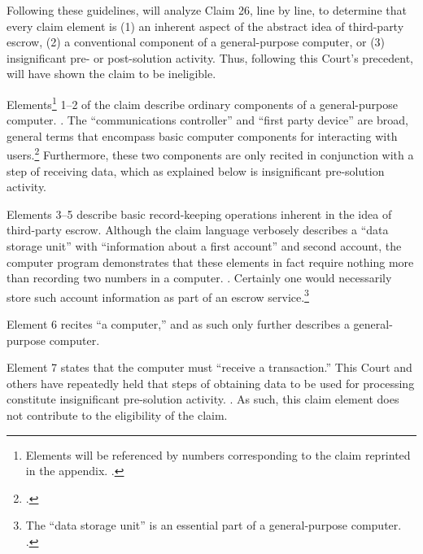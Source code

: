 \documentclass{scotus}
\begin{document}
Following these guidelines, \amici will analyze Claim 26, line by
line, to determine that every claim element is (1) an inherent aspect of the
abstract idea of third-party escrow, (2) a conventional component of a
general-purpose computer, or
(3) insignificant pre- or post-solution activity.
Thus, following this Court's precedent, \amici will have shown the claim to be
ineligible.


Elements\footnote{Elements will be referenced by numbers corresponding to
the claim reprinted in the appendix. .} 1--2 of
the
claim describe ordinary components of a general-purpose computer. . The ``communications controller'' and
``first party device'' are broad, general terms that encompass basic computer
components for interacting with users.\footnote{.} Furthermore,
these two components are only recited in conjunction with a step of receiving
data, which as explained below is insignificant pre-solution activity.

Elements 3--5 describe basic record-keeping operations inherent in the idea of
third-party escrow. Although the claim language verbosely describes a ``data
storage unit'' with ``information about a first account'' and second account,
the computer program demonstrates that these elements in fact
require nothing more than recording two
numbers in a computer. .
Certainly one would necessarily store such account information as part of an
escrow service.\footnote{The ``data storage unit'' is an essential part of a
general-purpose computer. .}

Element 6 recites ``a computer,'' and as such only further describes a
general-purpose computer.

Element 7 states that the computer must ``receive a transaction.'' This Court
and others have repeatedly held that steps of
obtaining data to be used for processing
constitute insignificant pre-solution activity. . As such,
this
claim element does not contribute to the eligibility of the claim.
\end{document}
